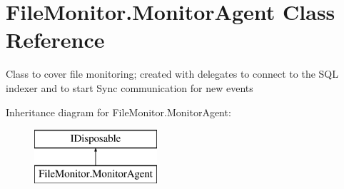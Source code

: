 \hypertarget{class_file_monitor_1_1_monitor_agent}{\section{File\-Monitor.\-Monitor\-Agent Class Reference}
\label{class_file_monitor_1_1_monitor_agent}
}


Class to cover file monitoring; created with delegates to connect to the S\-Q\-L indexer and to start Sync communication for new events  


Inheritance diagram for File\-Monitor.\-Monitor\-Agent\-:\begin{figure}[H]
\begin{center}
\leavevmode
\includegraphics[height=2.000000cm]{class_file_monitor_1_1_monitor_agent}
\end{center}
\end{figure}
